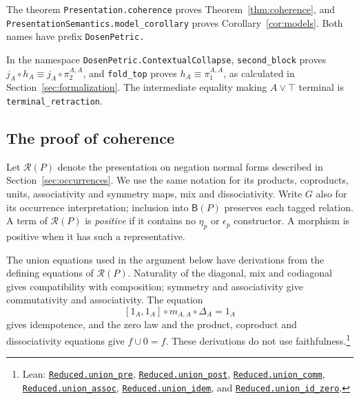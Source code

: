 \documentclass[11pt]{article}
\newcommand{\B}{\mathsf B}
\begin{document}
The theorem \texttt{Presentation.\allowbreak{}coherence} proves
Theorem~\ref{thm:coherence}, and
\texttt{PresentationSemantics.\allowbreak{}model\_corollary} proves
Corollary~\ref{cor:models}.
Both names have prefix \texttt{DosenPetric.}

In the namespace \texttt{DosenPetric.\allowbreak{}ContextualCollapse},
\texttt{second\_block} proves
$j_A\circ h_A\equiv j_A\circ\pi_2^{A,A}$, and
\texttt{fold\_top} proves
$h_A\equiv\pi_1^{A,A}$, as calculated in
Section~\ref{sec:formalization}.
The intermediate equality making $A\vee\top$ terminal is
\texttt{terminal\_retraction}.

\subsection{The proof of coherence}\label{app:coherence-proof}

Let $\mathcal R(P)$ denote the presentation on negation normal
forms described in Section~\ref{sec:occurrences}. We use the same
notation for its products, coproducts, units, associativity and
symmetry maps, mix and dissociativity. Write $G$ also for its occurrence
interpretation; inclusion into $\B(P)$ preserves each tagged
relation. A term of $\mathcal R(P)$
is \emph{positive} if it contains no $\eta_p$ or $\epsilon_p$
constructor. A morphism is positive when it has such a representative.

The union equations used in the argument below have derivations
from the defining equations of $\mathcal R(P)$.
Naturality of the diagonal, mix and codiagonal gives compatibility
with composition; symmetry and associativity give commutativity
and associativity. The equation
\[
 [1_A,1_A]\circ m_{A,A}\circ\Delta_A=1_A
\]
gives idempotence, and the zero law and the product, coproduct
and dissociativity equations give $f\cup0=f$.
These derivations do not use faithfulness.\footnote{\raggedright Lean:
\href{https://github.com/flengyel/Dosen-Petric-Maximality/blob/5dbee39bea09539bd130f729e82636419f71f920/DosenPetric/ReducedUnion.lean\#L80}{\texttt{Reduced.\allowbreak{}union\_pre}},
\href{https://github.com/flengyel/Dosen-Petric-Maximality/blob/5dbee39bea09539bd130f729e82636419f71f920/DosenPetric/ReducedUnion.lean\#L85}{\texttt{Reduced.\allowbreak{}union\_post}},
\href{https://github.com/flengyel/Dosen-Petric-Maximality/blob/5dbee39bea09539bd130f729e82636419f71f920/DosenPetric/ReducedUnion.lean\#L90}{\texttt{Reduced.\allowbreak{}union\_comm}},
\href{https://github.com/flengyel/Dosen-Petric-Maximality/blob/5dbee39bea09539bd130f729e82636419f71f920/DosenPetric/ReducedUnion.lean\#L131}{\texttt{Reduced.\allowbreak{}union\_assoc}},
\href{https://github.com/flengyel/Dosen-Petric-Maximality/blob/5dbee39bea09539bd130f729e82636419f71f920/DosenPetric/ReducedUnion.lean\#L97}{\texttt{Reduced.\allowbreak{}union\_idem}}, and
\href{https://github.com/flengyel/Dosen-Petric-Maximality/blob/5dbee39bea09539bd130f729e82636419f71f920/DosenPetric/ReducedUnion.lean\#L145}{\texttt{Reduced.\allowbreak{}union\_id\_zero}}.}
\end{document}
